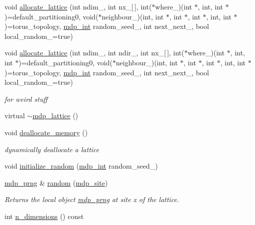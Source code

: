 \begin{DoxyCompactItemize}
void \hyperlink{classmdp__lattice_a04f3271fe78a6f61f10c4151145f6db5}{allocate\_\-lattice} (int ndim\_\-, int nx\_\-\mbox{[}$\,$\mbox{]}, int($\ast$where\_\-)(int $\ast$, int, int $\ast$)=default\_\-partitioning0, void($\ast$neighbour\_\-)(int, int $\ast$, int $\ast$, int $\ast$, int, int $\ast$)=torus\_\-topology, \hyperlink{mdp__global__vars_8h_aaa1ad9d0dcd2124aa5af0120d9954174}{mdp\_\-int} random\_\-seed\_, int next\_\-next\_, bool local\_\-random\_\-=true)
\item 
void \hyperlink{classmdp__lattice_a8e5ed5d10679379892b46f3359d5971c}{allocate\_\-lattice} (int ndim\_\-, int ndir\_\-, int nx\_\-\mbox{[}$\,$\mbox{]}, int($\ast$where\_\-)(int $\ast$, int, int $\ast$)=default\_\-partitioning0, void($\ast$neighbour\_\-)(int, int $\ast$, int $\ast$, int $\ast$, int, int $\ast$)=torus\_\-topology, \hyperlink{mdp__global__vars_8h_aaa1ad9d0dcd2124aa5af0120d9954174}{mdp\_\-int} random\_\-seed\_, int next\_\-next\_, bool local\_\-random\_\-=true)
\begin{DoxyCompactList}\small\item\em for weird stuff \item\end{DoxyCompactList}\item 
virtual \hyperlink{classmdp__lattice_a04eafca14369c88c7c469ffeb72e54ec}{$\sim$mdp\_\-lattice} ()
\item 
void \hyperlink{classmdp__lattice_af5407cf7f7d5eded3870abf0515e110d}{deallocate\_\-memory} ()
\begin{DoxyCompactList}\small\item\em dynamically deallocate a lattice \item\end{DoxyCompactList}\item 
void \hyperlink{classmdp__lattice_a1d9c9be3661c7e0ccd05d9c1ed620178}{initialize\_\-random} (\hyperlink{mdp__global__vars_8h_aaa1ad9d0dcd2124aa5af0120d9954174}{mdp\_\-int} random\_\-seed\_)
\item 
\hyperlink{classmdp__prng}{mdp\_\-prng} \& \hyperlink{classmdp__lattice_a93f774075f5829c57009c644a74cfd4a}{random} (\hyperlink{classmdp__site}{mdp\_\-site})
\begin{DoxyCompactList}\small\item\em Returns the local object \hyperlink{classmdp__prng}{mdp\_\-prng} at site x of the lattice. \item\end{DoxyCompactList}\item 
int \hyperlink{classmdp__lattice_a7e99975b0536e5f46acc8b72778c077f}{n\_\-dimensions} () const 

\end{DoxyCompactItemize}
